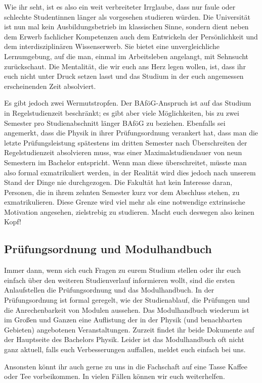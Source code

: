 Wie ihr seht, ist es also ein weit verbreiteter Irrglaube, dass nur faule oder schlechte Studentinnen länger als vorgesehen studieren würden. Die Universität ist nun mal kein Ausbildungsbetrieb im klassischen Sinne, sondern dient neben dem Erwerb fachlicher Kompetenzen auch dem Entwickeln der Persönlichkeit und dem interdisziplinären Wissenserwerb. Sie bietet eine unvergleichliche Lernumgebung, auf die man, einmal im Arbeitsleben angelangt, mit Sehnsucht zurückschaut. Die Mentalität, die wir euch ans Herz legen wollen, ist, dass ihr euch nicht unter Druck setzen lasst und das Studium in der euch angemessen erscheinenden Zeit absolviert.

Es gibt jedoch zwei Wermutstropfen. Der BAföG-Anspruch ist auf das Studium in Regelstudienzeit beschränkt; es gibt aber viele Möglichkeiten, bis zu zwei Semester pro Studienabschnitt länger BAföG zu beziehen. Ebenfalls sei angemerkt, dass die Physik in ihrer Prüfungsordnung verankert hat, dass man die letzte Prüfungsleistung spätestens im dritten Semester nach Überschreiten der Regelstudienzeit absolvieren muss, was einer Maximalstudiendauer von neun Semestern im Bachelor entspricht. Wenn man diese überschreitet, müsste man also formal exmatrikuliert werden, in der Realität wird dies jedoch nach unserem Stand der Dinge nie durchgezogen. Die Fakultät hat kein Interesse daran, Personen, die in ihrem zehnten Semester kurz vor dem Abschluss stehen, zu exmatrikulieren. Diese Grenze wird viel mehr als eine notwendige extrinsische Motivation angesehen, zielstrebig zu studieren. Macht euch deswegen also keinen Kopf!

\subsection{Prüfungsordnung und Modulhandbuch}

\begin{figure}[b]
\end{figure}

Immer dann, wenn sich euch Fragen zu eurem Studium stellen oder ihr euch einfach über den weiteren Studienverlauf informieren wollt, sind die ersten Anlaufstellen die Prüfungsordnung und das Modulhandbuch. In der Prüfungsordnung ist formal geregelt, wie der Studienablauf, die Prüfungen und die Anrechenbarkeit von Modulen aussehen. Das Modulhandbuch wiederum ist im Großen und Ganzen eine Auflistung der in der Physik (und benachbarten Gebieten) angebotenen Veranstaltungen. Zurzeit findet ihr beide Dokumente auf der Hauptseite des Bachelors Physik. Leider ist das Modulhandbuch oft nicht ganz aktuell, falls euch Verbesserungen auffallen, meldet euch einfach bei uns.

Ansonsten könnt ihr auch gerne zu uns in die Fachschaft auf eine Tasse Kaffee oder Tee vorbeikommen. In vielen Fällen können wir euch weiterhelfen.
